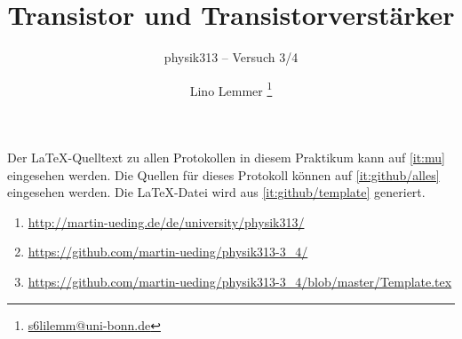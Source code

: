 


\usepackage{placeins}



\subject{Praktikumsprotokoll}
\title{Transistor und Transistorverstärker}
\subtitle{physik313 – Versuch 3/4}
\author{
	Lino Lemmer \footnote{\href{mailto:s6lilemm@uni-bonn.de}{s6lilemm@uni-bonn.de}}
}


\newcommand\IB{I_\text{B}}
\newcommand\IC{I_\text{C}}
\newcommand\ID{I_\text{D}}
\newcommand\IE{I_\text{E}}
\newcommand\IS{I_\text{S}}
\newcommand\RC{R_\text{C}}
\newcommand\RE{R_\text{E}}
\newcommand\UBE{U_\text{BE}}
\newcommand\UB{U_\text{B}}
\newcommand\UC{U_\text{C}}
\newcommand\UCE{U_\text{CE}}
\newcommand\UE{U_\text{E}}
\newcommand\UGS{U_\text{GS}}

\usepackage{tocloft}


\newcommand{\FIXME}[1]{\printTODO{FIXME: #1}}
\newcommand{\TODO}[1]{\printTODO{TODO: #1}}
\newcommand{\XXX}[1]{\printTODO{XXX: #1}}
\newcommand{\FRAGE}[1]{\printTODO{Rückfrage: #1}}

\newcommand{\printTODO}[1]{
	\par%
	\textcolor{OrangeRed}{\textsf{#1}}%
	\par%
	\refstepcounter{todo}
	\addcontentsline{lotd}{todo}{#1}
}




\maketitle

Der \LaTeX-Quelltext zu allen Protokollen in diesem Praktikum kann auf
\ref{it:mu} eingesehen werden. Die Quellen für dieses Protokoll können auf
\ref{it:github/alles} eingesehen werden. Die \LaTeX-Datei wird aus
\ref{it:github/template} generiert.

\begin{enumerate}
	\item
		\label{it:mu}
		\url{http://martin-ueding.de/de/university/physik313/}
	\item
		\label{it:github/alles}
		\url{https://github.com/martin-ueding/physik313-3_4/}
	\item
		\label{it:github/template}
		\url{https://github.com/martin-ueding/physik313-3_4/blob/master/Template.tex}
\end{enumerate}

